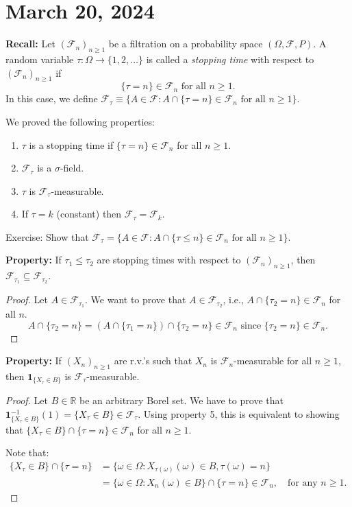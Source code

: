 \section{March 20, 2024}

\textbf{Recall:}
Let $(\mathcal{F}_n)_{n\geq 1}$ be a filtration on a probability space $(\Omega, \mathcal{F}, P)$. A random variable $\tau: \Omega \to \{1, 2, \ldots \}$ is called a \textit{stopping time} with respect to $(\mathcal{F}_n)_{n\geq 1}$ if
\[
\{\tau = n\} \in \mathcal{F}_n \text{ for all } n \geq 1.
\]
In this case, we define $\mathcal{F}_\tau \equiv \{A \in \mathcal{F}: A \cap \{\tau = n\} \in \mathcal{F}_n \text{ for all } n \geq 1\}$.


We proved the following properties:
\begin{enumerate}
    \item $\tau$ is a stopping time if $\{\tau = n\} \in \mathcal{F}_n$ for all $n \geq 1$.
    \item $\mathcal{F}_\tau$ is a $\sigma$-field.
    \item $\tau$ is $\mathcal{F}_\tau$-measurable.
    \item If $\tau = k$ (constant) then $\mathcal{F}_\tau = \mathcal{F}_k$.
\end{enumerate}
Exercise: Show that $\mathcal{F}_\tau = \{A \in \mathcal{F}: A \cap \{\tau \leq n\} \in \mathcal{F}_n \text{ for all } n \geq 1\}$.


\textbf{Property:}
If $\tau_1 \leq \tau_2$ are stopping times with respect to $(\mathcal{F}_n)_{n\geq 1}$, then $\mathcal{F}_{\tau_1} \subseteq \mathcal{F}_{\tau_2}$.

\begin{proof}
Let $A \in \mathcal{F}_{\tau_1}$. We want to prove that $A \in \mathcal{F}_{\tau_2}$, i.e., $A \cap \{\tau_2 = n\} \in \mathcal{F}_n$ for all $n$.
\[
A \cap \{\tau_2 = n\} = (A \cap \{\tau_1 = n\}) \cap \{\tau_2 = n\} \in \mathcal{F}_n \text{ since } \{\tau_2 = n\} \in \mathcal{F}_n.
\]
\end{proof}

\textbf{Property:}
If $(X_n)_{n\geq 1}$ are r.v.'s such that $X_n$ is $\mathcal{F}_n$-measurable for all $n \geq 1$, then $\mathbf{1}_{\{X_{\tau} \in B\}}$ is $\mathcal{F}_{\tau}$-measurable.

\begin{proof}
Let $B \in \mathbb{R}$ be an arbitrary Borel set. We have to prove that $\mathbf{1}_{\{X_{\tau} \in B\}}^{-1}(1) = \{X_{\tau} \in B\} \in \mathcal{F}_{\tau}$. Using property 5, this is equivalent to showing that $\{X_{\tau} \in B\} \cap \{\tau = n\} \in \mathcal{F}_n$ for all $n \geq 1$.

Note that:
\begin{align*}
\{X_{\tau} \in B\} \cap \{\tau = n\} &= \{\omega \in \Omega : X_{\tau(\omega)}(\omega) \in B, \tau(\omega) = n\} \\
&= \{\omega \in \Omega : X_n(\omega) \in B\} \cap \{\tau = n\} \in \mathcal{F}_n, \quad \text{for any } n \geq 1.
\end{align*}
\end{proof}


